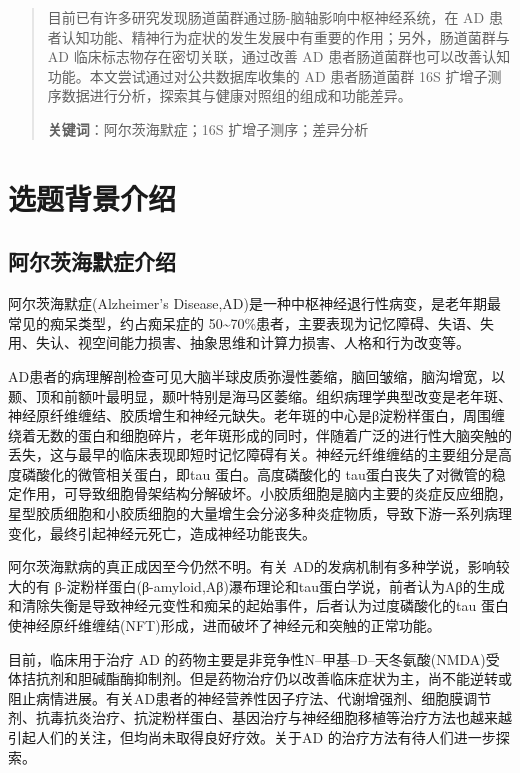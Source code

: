\documentclass[supercite]{HustGraduPaper}
\begin{document}
\clearpage%

\begin{abstract}
	目前已有许多研究发现肠道菌群通过肠-脑轴影响中枢神经系统，在 AD 患者认知功能、精神行为症状的发生发展中有重要的作用；另外，肠道菌群与 AD 临床标志物存在密切关联，通过改善 AD 患者肠道菌群也可以改善认知功能。本文尝试通过对公共数据库收集的 AD 患者肠道菌群 16S 扩增子测序数据进行分析，探索其与健康对照组的组成和功能差异。
	
	{\songti \bfseries 关键词}：阿尔茨海默症；16S 扩增子测序；差异分析
\end{abstract}
\section{选题背景介绍}


\subsection{阿尔茨海默症介绍}

阿尔茨海默症(Alzheimer's Disease,AD)是一种中枢神经退行性病变，是老年期最常见的痴呆类型，约占痴呆症的
50\textasciitilde70\%患者，主要表现为记忆障碍、失语、失用、失认、视空间能力损害、抽象思维和计算力损害、人格和行为改变等\cite{Burnsb158}。

AD患者的病理解剖检查可见大脑半球皮质弥漫性萎缩，脑回皱缩，脑沟增宽，以颞、顶和前额叶最明显，颞叶特别是海马区萎缩\cite{wenk2003neuropathologic}。组织病理学典型改变是老年斑、神经原纤维缠结、胶质增生和神经元缺失\cite{tiraboschi2004importance}。老年斑的中心是β淀粉样蛋白，周围缠绕着无数的蛋白和细胞碎片，老年斑形成的同时，伴随着广泛的进行性大脑突触的丢失，这与最早的临床表现即短时记忆障碍有关。神经元纤维缠结的主要组分是高度磷酸化的微管相关蛋白，即tau 蛋白。高度磷酸化的 tau蛋白丧失了对微管的稳定作用，可导致细胞骨架结构分解破坏。小胶质细胞是脑内主要的炎症反应细胞，星型胶质细胞和小胶质细胞的大量增生会分泌多种炎症物质，导致下游一系列病理变化，最终引起神经元死亡，造成神经功能丧失。

阿尔茨海默病的真正成因至今仍然不明。有关 AD的发病机制有多种学说，影响较大的有 β-淀粉样蛋白(β-amyloid,Aβ)瀑布理论\cite{hardy1991amyloid}和tau蛋白学说\cite{goedert1991tau}，前者认为Aβ的生成和清除失衡是导致神经元变性和痴呆的起始事件，后者认为过度磷酸化的tau 蛋白使神经原纤维缠结(NFT)形成，进而破坏了神经元和突触的正常功能。

目前，临床用于治疗 AD 的药物主要是非竞争性N--甲基--D--天冬氨酸(NMDA)受体拮抗剂和胆碱酯酶抑制剂。但是药物治疗仍以改善临床症状为主，尚不能逆转或阻止病情进展\cite{wall2014bacterial}。有关AD患者的神经营养性因子疗法、代谢增强剂、细胞膜调节剂、抗毒抗炎治疗、抗淀粉样蛋白、基因治疗与神经细胞移植等治疗方法也越来越引起人们的关注，但均尚未取得良好疗效\cite{hsu2017primary}。关于AD 的治疗方法有待人们进一步探索。
\end{document}
